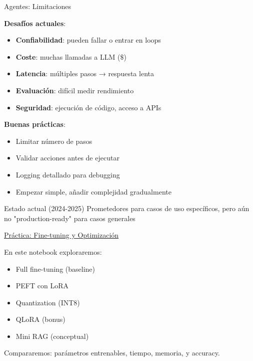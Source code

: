 \begin{frame}{Agentes: Limitaciones}

\textbf{Desafíos actuales}:
\begin{itemize}
    \item \textbf{Confiabilidad}: pueden fallar o entrar en loops
    \item \textbf{Coste}: muchas llamadas a LLM ($\$$)
    \item \textbf{Latencia}: múltiples pasos → respuesta lenta
    \item \textbf{Evaluación}: difícil medir rendimiento
    \item \textbf{Seguridad}: ejecución de código, acceso a APIs
\end{itemize}

\vspace{0.5em}

\textbf{Buenas prácticas}:
\begin{itemize}
    \item Limitar número de pasos
    \item Validar acciones antes de ejecutar
    \item Logging detallado para debugging
    \item Empezar simple, añadir complejidad gradualmente
\end{itemize}

\vspace{0.5em}

\begin{block}{Estado actual (2024-2025)}
Prometedores para casos de uso específicos, pero aún no "production-ready" para casos generales
\end{block}

\end{frame}

\begin{exercise}
\href{https://colab.research.google.com/}{Práctica: Fine-tuning y Optimización}

En este notebook exploraremos:
\begin{itemize}
    \item Full fine-tuning (baseline)
    \item PEFT con LoRA
    \item Quantization (INT8)
    \item QLoRA (bonus)
    \item Mini RAG (conceptual)
\end{itemize}

Compararemos: parámetros entrenables, tiempo, memoria, y accuracy.
\end{exercise}

